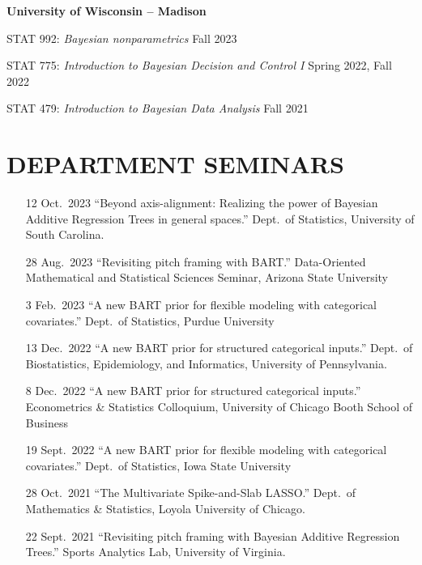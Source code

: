 \documentclass[margin]{res}
\begin{document}
\begin{resume}
\textbf{University of Wisconsin -- Madison} 

STAT 992: {\it Bayesian nonparametrics} \hfill Fall 2023

STAT 775: {\it Introduction to Bayesian Decision and Control I} \hfill Spring 2022, Fall 2022

STAT 479: {\it Introduction to Bayesian Data Analysis} \hfill Fall 2021


\section{DEPARTMENT SEMINARS}

\vspace{0.5in}
\begin{itemize}

\item[12 Oct.~2023]{``Beyond axis-alignment: Realizing the power of Bayesian Additive Regression Trees in general spaces.'' Dept.~of Statistics, University of South Carolina.}

\item[28 Aug.~2023]{``Revisiting pitch framing with BART.'' Data-Oriented Mathematical and Statistical Sciences Seminar, Arizona State University}

\item[3 Feb.~2023]{``A new BART prior for flexible modeling with categorical covariates.'' Dept.~of Statistics, Purdue University}

\item[13 Dec.~2022]{``A new BART prior for structured categorical inputs.'' Dept.~of Biostatistics, Epidemiology, and Informatics, University of Pennsylvania.}

\item[8 Dec.~2022]{``A new BART prior for structured categorical inputs.'' Econometrics \& Statistics Colloquium, University of Chicago Booth School of Business}

\item[19 Sept.~2022]{``A new BART prior for flexible modeling with categorical covariates.'' Dept.~of Statistics, Iowa State University}

\item[28 Oct.~2021]{``The Multivariate Spike-and-Slab LASSO.'' Dept.~of Mathematics \& Statistics, Loyola University of Chicago.}

\item[22 Sept.~2021]{``Revisiting pitch framing with Bayesian Additive Regression Trees.'' Sports Analytics Lab, University of Virginia.}


\end{itemize}
\end{resume}
\end{document}
